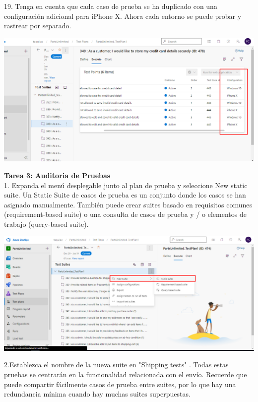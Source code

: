 \documentclass[12pt,letterpaper]{article}
\begin{document}
19. Tenga en cuenta que cada caso de prueba se ha duplicado con una configuración adicional para iPhone X. Ahora cada entorno se puede probar y rastrear por separado.

\begin{center}
		\includegraphics[width=15cm]{./Imagenes/29} 
\end{center}

\textbf{Tarea 3: Auditoria de Pruebas}\\

1. Expanda el menú desplegable junto al plan de prueba y seleccione New static suite. Un Static Suite de casos de prueba es un conjunto donde los casos se han asignado manualmente. También puede crear suites basado en requisitos comunes (requirement-based suite) o una consulta de casos de prueba y / o elementos de trabajo (query-based suite).

\begin{center}
		\includegraphics[width=15cm]{./Imagenes/30} 
\end{center}

2.Establezca el nombre de la nueva suite en "Shipping tests" . Todas estas pruebas se centrarán en la funcionalidad relacionada con el envío. Recuerde que puede compartir fácilmente casos de prueba entre suites, por lo que hay una redundancia mínima cuando hay muchas suites superpuestas.
\end{document}
